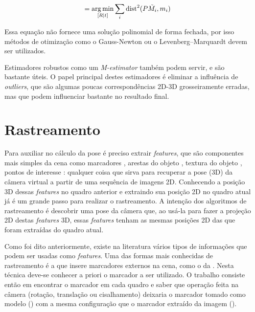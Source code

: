 \begin{equation}
[R | t] = \argmin_{[R | t]} \sum_i \text{dist}^2(P\tilde{M_i}, m_i)
\label{calculo_pose}
\end{equation}

Essa equação não fornece uma solução polinomial de forma fechada, por isso métodos de otimização como o Gauss-Newton ou o Levenberg–Marquardt devem ser utilizados.

Estimadores robustos como um \emph{M-estimator} também podem servir, e são bastante úteis. O papel principal destes estimadores é eliminar a influência de \emph{outliers}, que são algumas poucas correspondências 2D-3D grosseiramente erradas, mas que podem influenciar bastante no resultado final.

\section{Rastreamento}

Para auxiliar no cálculo da pose é preciso extrair \emph{features}, que são componentes mais simples da cena como marcadores \cite{ref_marcadores}, arestas do objeto \cite{ref_arestas}, textura do objeto \cite{ref_textura}, pontos de interesse \cite{ref_pontosdeinteresse}: qualquer coisa que sirva para recuperar a pose (3D) da câmera virtual a partir de uma sequência de imagens 2D. Conhecendo a posição 3D dessas \emph{features} no quadro anterior e extraindo sua posição 2D no quadro atual já é um grande passo para realizar o rastreamento. A intenção dos algoritmos de rastreamento é descobrir uma pose da câmera que, ao usá-la para fazer a projeção 2D destas \emph{features} 3D, essas \emph{features} tenham as mesmas posições 2D das que foram extraídas do quadro atual.

Como foi dito anteriormente, existe na literatura vários tipos de informações que podem ser usadas como \emph{features}. Uma das formas mais conhecidas de rastreamento é a que insere marcadores externos na cena, como o da . Nesta técnica deve-se conhecer a priori o marcador a ser utilizado. O trabalho consiste então em encontrar o marcador em cada quadro e saber que operação feita na câmera (rotação, translação ou cisalhamento) deixaria o marcador tomado como modelo () com a mesma configuração que o marcador extraído da imagem ().

